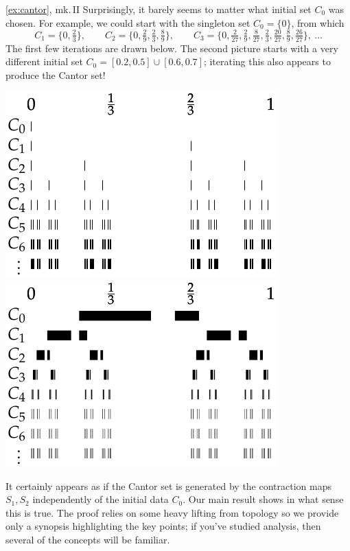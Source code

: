 \begin{example*}{\ref{ex:cantor}, mk.\,II}{}
	Surprisingly, it barely seems to matter what initial set $C_0$ was chosen. For example, we could start with the singleton set $C_0=\{0\}$, from which
	\[
		C_1=\{0,\tfrac 23\},\qquad C_2=\{0,\tfrac 29,\tfrac 23,\tfrac 89\},\qquad C_3=\{0,\tfrac 2{27},\tfrac 29,\tfrac 8{27},\tfrac 23,\tfrac{20}{27},\tfrac 89,\tfrac{26}{27}\},\ \ldots
	\]
	The first few iterations are drawn below. The second picture starts with a very different initial set $C_0=[0.2,0.5]\cup[0.6,0.7]$; iterating this also appears to produce the Cantor set!
	\begin{center}
		\includegraphics{cantor-similar3}
		\qquad\qquad
		\includegraphics{cantor-similar2}
	\end{center}
\end{example*}

\goodbreak



It certainly appears as if the Cantor set is generated by the contraction maps $S_1,S_2$ independently of the initial data $C_0$. Our main result shows in what sense this is true. The proof relies on some heavy lifting from topology so we provide only a synopsis highlighting the key points; if you've studied analysis, then several of the concepts will be familiar.

